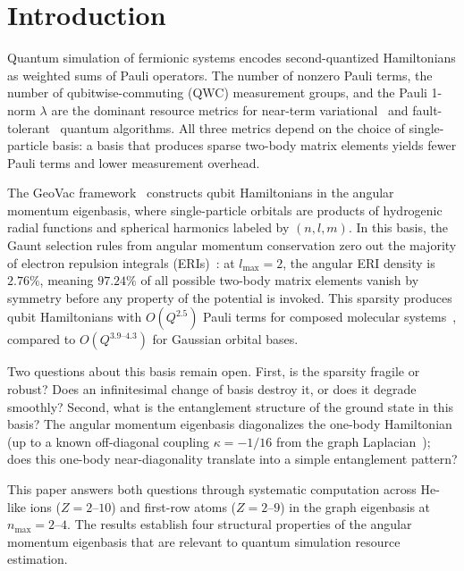 \documentclass[twocolumn,pra,amsmath,amssymb,superscriptaddress]{revtex4-2}
\begin{document}
\section{Introduction}
\label{sec:intro}

Quantum simulation of fermionic systems encodes second-quantized
Hamiltonians as weighted sums of Pauli operators.  The number of
nonzero Pauli terms, the number of qubitwise-commuting (QWC)
measurement groups, and the Pauli 1-norm $\lambda$ are the dominant
resource metrics for near-term variational~\cite{Peruzzo2014} and
fault-tolerant~\cite{Lee2021} quantum algorithms.  All three
metrics depend on the choice of single-particle basis: a basis
that produces sparse two-body matrix elements yields fewer Pauli
terms and lower measurement overhead.

The GeoVac framework~\cite{GeoVac_Paper0, GeoVac_Paper7,
GeoVac_Paper14} constructs qubit Hamiltonians in the angular
momentum eigenbasis, where single-particle orbitals are products
of hydrogenic radial functions and spherical harmonics labeled by
$(n, l, m)$.  In this basis, the Gaunt selection rules from angular
momentum conservation zero out the majority of electron repulsion
integrals (ERIs)~\cite{GeoVac_Paper22}: at $l_{\max} = 2$, the
angular ERI density is $2.76\%$, meaning $97.24\%$ of all possible
two-body matrix elements vanish by symmetry before any property of
the potential is invoked.  This sparsity produces qubit
Hamiltonians with $O(Q^{2.5})$ Pauli terms for composed molecular
systems~\cite{GeoVac_Paper14}, compared to $O(Q^{3.9\text{--}4.3})$
for Gaussian orbital bases.

Two questions about this basis remain open.  First, is the sparsity
fragile or robust?  Does an infinitesimal change of basis destroy
it, or does it degrade smoothly?  Second, what is the entanglement
structure of the ground state in this basis?  The angular momentum
eigenbasis diagonalizes the one-body Hamiltonian (up to a known
off-diagonal coupling $\kappa = -1/16$ from the graph
Laplacian~\cite{GeoVac_Paper7}); does this one-body near-diagonality
translate into a simple entanglement pattern?

This paper answers both questions through systematic computation
across He-like ions ($Z = 2$--$10$) and first-row atoms
($Z = 2$--$9$) in the graph eigenbasis at $n_{\max} = 2$--$4$.
The results establish four structural properties of the angular
momentum eigenbasis that are relevant to quantum simulation
resource estimation.
\end{document}
